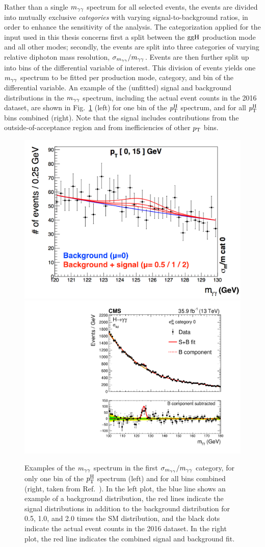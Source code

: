 Rather than a single $m_{\mathrm{\gamma}\mathrm{\gamma}}$ spectrum for all selected events, the events are divided into mutually exclusive \textit{categories} with varying signal-to-background ratios, in order to enhance the sensitivity of the analysis.
% 
The categorization applied for the input used in this thesis concerns first a split between the $\mathrm{g}\mathrm{g}\mathrm{H}$ production mode and all other modes; secondly, the events are split into three categories of varying relative diphoton mass resolution, $\sigma_{m_{\mathrm{\gamma}\mathrm{\gamma}}} / m_{\mathrm{\gamma}\mathrm{\gamma}}$.
% 
Events are then further split up into bins of the differential variable of interest.
% 
This division of events yields one $m_{\mathrm{\gamma}\mathrm{\gamma}}$ spectrum to be fitted per production mode, category, and bin of the differential variable.
% 
An example of the (unfitted) signal and background distributions in the $m_{\mathrm{\gamma}\mathrm{\gamma}}$ spectrum, including the actual event counts in the 2016 dataset, are shown in Fig.~\ref{fig:example_mgg} (left) for one bin of the $p_\mathrm{T}^\mathrm{H}$ spectrum, and for all $p_\mathrm{T}^\mathrm{H}$ bins combined (right).
% 
Note that the signal includes contributions from the outside-of-acceptance region and from inefficiencies of other $p_\mathrm{T}$ bins.

\begin{figure}[hbtp]
  \begin{center}
    \includegraphics[width=0.49\linewidth]{img/inputs/hgg/example_mgg.png}
    \includegraphics[width=0.49\linewidth]{img/inputs/hgg/example_mgg_allbins.pdf}
    \caption{
        Examples of the $m_{\mathrm{\gamma}\mathrm{\gamma}}$ spectrum in the first $\sigma_{m_{\mathrm{\gamma}\mathrm{\gamma}}} / m_{\mathrm{\gamma}\mathrm{\gamma}}$ category, for only one bin of the $p_\mathrm{T}^\mathrm{H}$ spectrum (left) and for all bins combined (right, taken from Ref.~\cite{Sirunyan:2018kta}).
        In the left plot, the blue line shows an example of a background distribution, the red lines indicate the signal distributions in addition to the background distribution for 0.5, 1.0, and 2.0 times the SM distribution, and the black dots indicate the actual event counts in the 2016 dataset.
        In the right plot, the red line indicates the combined signal and background fit.
        }
    \label{fig:example_mgg}
  \end{center}
\end{figure}


